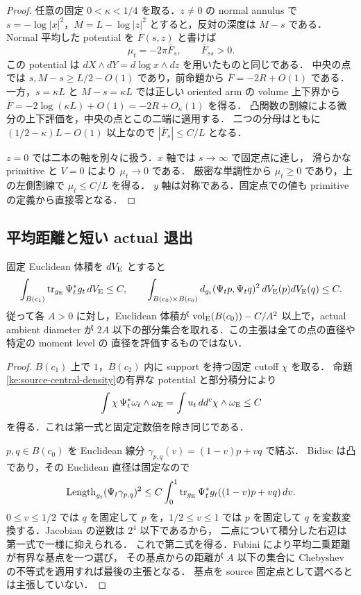 \begin{proof}
任意の固定 $0<\kappa<1/4$ を取る．$z\ne0$ の normal annulus で
$s=-\log|x|^2$，$M=L-\log|z|^2$ とすると，反対の深度は $M-s$ である．
Normal 平均した potential を $\overline F(s,z)$ と書けば
\[
 \mu_t=-2\pi\overline F_s,
 \qquad \overline F_{ss}>0.
\]
この potential は $dX\wedge dY=d\log x\wedge dz$ を用いたものと同じである．
中央の点では $s,M-s\ge L/2-O(1)$ であり，前命題から
$\overline F=-2R+O(1)$ である．一方，$s=\kappa L$ と
$M-s=\kappa L$ では正しい oriented arm の volume 上下界から
$\overline F=-2\log(\kappa L)+O(1)=-2R+O_\kappa(1)$ を得る．
凸関数の割線による微分の上下評価を，中央の点とこの二端に適用する．
二つの分母はともに $(1/2-\kappa)L-O(1)$ 以上なので
$|\overline F_s|\le C/L$ となる．

$z=0$ では二本の軸を別々に扱う．$x$ 軸では $s\to\infty$ で固定点に達し，
滑らかな primitive と $V=0$ により $\mu_t\to0$ である．
厳密な単調性から $\mu_t\ge0$ であり，上の左側割線で $\mu_t\le C/L$ を得る．
$y$ 軸は対称である．固定点での値も primitive の定義から直接零となる．
\end{proof}

\subsection{平均距離と短い actual 退出}

\begin{proposition}
\label{ke:source-central-mean-distance}
固定 Euclidean 体積を $dV_{\rm E}$ とすると
\[
 \int_{B(c_1)}\operatorname{tr}_{g_{\rm E}}\Psi_t^*g_t\,dV_{\rm E}\le C,
 \qquad
 \int_{B(c_0)\times B(c_0)}
 d_{g_t}(\Psi_t p,\Psi_t q)^2\,dV_{\rm E}(p)dV_{\rm E}(q)\le C.
\]
従って各 $A>0$ に対し，Euclidean 体積が
$\operatorname{vol}_{\rm E}(B(c_0))-C/A^2$ 以上で，actual ambient diameter が
$2A$ 以下の部分集合を取れる．この主張は全ての点の直径や特定の moment level の
直径を評価するものではない．
\end{proposition}

\begin{proof}
$B(c_1)$ 上で $1$，$B(c_2)$ 内に support を持つ固定 cutoff $\chi$ を取る．
命題\ref{ke:source-central-density}の有界な potential と部分積分により
\[
 \int\chi\,\Psi_t^*\omega_t\wedge\omega_{\rm E}
 =\int u_t\,dd^c\chi\wedge\omega_{\rm E}\le C
\]
を得る．これは第一式と固定定数倍を除き同じである．

$p,q\in B(c_0)$ を Euclidean 線分 $\gamma_{p,q}(v)=(1-v)p+vq$ で結ぶ．
Bidisc は凸であり，その Euclidean 直径は固定なので
\[
 \operatorname{Length}_{g_t}(\Psi_t\gamma_{p,q})^2
 \le C\int_0^1
    \operatorname{tr}_{g_{\rm E}}\Psi_t^*g_t((1-v)p+vq)\,dv.
\]
$0\le v\le1/2$ では $q$ を固定して $p$ を，$1/2\le v\le1$ では
$p$ を固定して $q$ を変数変換する．Jacobian の逆数は $2^4$ 以下であるから，
二点について積分した右辺は第一式で一様に抑えられる．
これで第二式を得る．Fubini により平均二乗距離が有界な基点を一つ選び，
その基点からの距離が $A$ 以下の集合に Chebyshev の不等式を適用すれば最後の主張となる．
基点を source 固定点として選べるとは主張していない．
\end{proof}

